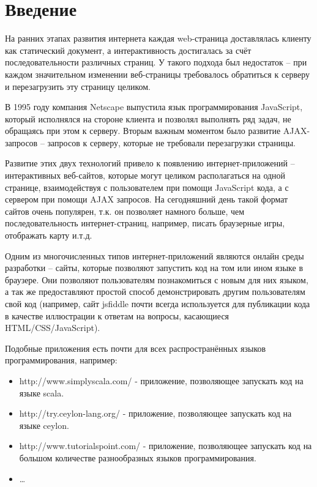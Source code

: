 \chapter*{Введение}

	На ранних этапах развития интернета каждая web-страница доставлялась клиенту как статический документ, а интерактивность достигалась за счёт последовательности различных страниц. У такого подхода был недостаток -- при каждом значительном изменении веб-страницы требовалось обратиться к серверу и перезагрузить эту страницу целиком. 

	В 1995 году компания Netscape выпустила язык программирования JavaScript, который исполнялся на стороне клиента и позволял выполнять ряд задач, не обращаясь при этом к серверу. Вторым важным моментом было развитие AJAX-запросов -- запросов к серверу, которые не требовали перезагрузки страницы. 
	
	Развитие этих двух технологий привело к появлению интернет-приложений -- интерактивных веб-сайтов, которые могут целиком располагаться на одной странице,  взаимодействуя с пользователем при помощи JavaScript кода, а с сервером при помощи AJAX запросов. На сегодняшний день такой формат сайтов очень популярен, т.к. он позволяет намного больше, чем последовательность интернет-страниц, например, писать браузерные игры, отображать карту и.т.д.
	
	Одним из многочисленных типов интернет-приложений являются онлайн среды разработки -- сайты, которые позволяют запустить код на том или ином языке в браузере. Они позволяют пользователям познакомиться с новым для них языком, а так же предоставляют простой способ демонстрировать другим пользователям свой код (например, сайт jsfiddle почти всегда используется для публикации кода в качестве иллюстрации к ответам на вопросы, касающиеся HTML/CSS/JavaScript).
	
	Подобные приложения есть почти для всех распространённых языков программирования, например:
\begin{itemize}
	\item http://www.simplyscala.com/ - приложение, позволяющее запускать код на языке scala. 
	\item http://try.ceylon-lang.org/ - приложение, позволяющее запускать код на языке ceylon.
	\item http://www.tutorialspoint.com/ - приложение, позволяющее запускать код на большом количестве разнообразных языков программирования.
	\item \dots
\end{itemize}


